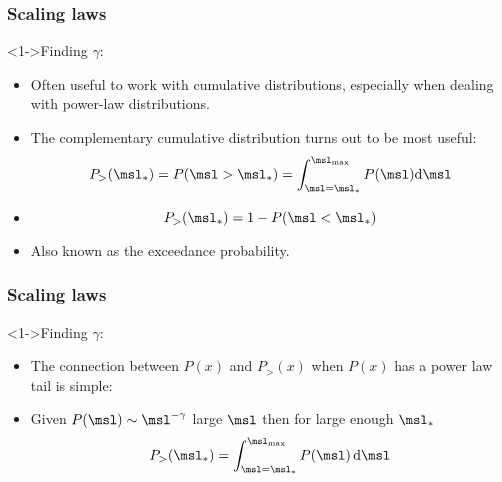 \begin{frame}[label=]
  \frametitle{Scaling laws}

  \begin{block}<1->{Finding $\gamma$:}
    \begin{itemize}
    \item<2-> Often useful to work with \alert{cumulative distributions},
      especially when dealing with power-law distributions.
    \item<3-> The complementary cumulative distribution turns out
      to be most useful:
      $$
      P_> (\msl_\ast) = 
      P (\msl > \msl_\ast) =
      \int_{\msl=\msl_{\ast}}^{\msl_{\max}} P(\msl) {\textnormal{d}}{\msl}
      $$
    \item<4->
      $$
      P_> (\msl_\ast) =  1 - P(\msl < \msl_\ast)
      $$
    \item<5-> Also known as the exceedance probability.
    \end{itemize}
  \end{block}

\end{frame}

\begin{frame}[label=]
  \frametitle{Scaling laws}

  \begin{block}<1->{Finding $\gamma$:}
    \begin{itemize}
      \item<1->
        The connection between $P(x)$ and $P_>(x)$ 
        when $P(x)$ has a power law tail is simple:
      \item<2->
        Given $P(\msl) \sim \msl^{-\gamma}$ large $\msl$ then
        for large enough $\msl_\ast$
        $$ 
        P_> (\msl_\ast) = 
        \int_{\msl=\msl_{\ast}}^{\msl_{\max}} P(\msl)\, {\textnormal{d}}{\msl}
        $$
    \end{itemize}
  \end{block}

\end{frame}

